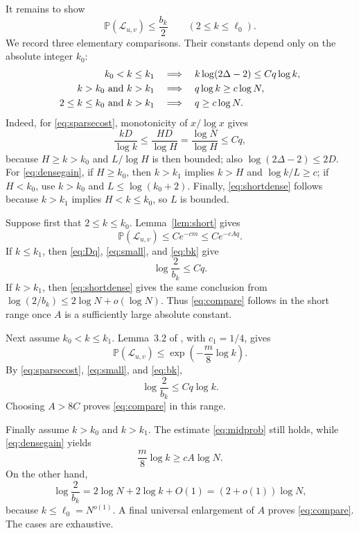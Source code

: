 \documentclass[11pt]{article}
\begin{document}
It remains to show
\begin{equation}\label{eq:compare}
 \mathbb P(\mathcal L_{u,v})\leq\frac{b_k}{2}
 \qquad (2\leq k\leq\ell_0).
\end{equation}
We record three elementary comparisons. Their constants depend only on the
absolute integer $k_0$:
\begin{align}
 k_0<k\leq k_1
 &\quad\Longrightarrow\quad
 k\log(2\Delta-2)\leq Cq\log k,
 \label{eq:sparsecost}\\
 k>k_0\ \hbox{and}\ k>k_1
 &\quad\Longrightarrow\quad
 q\log k\geq c\log N,
 \label{eq:densegain}\\
 2\leq k\leq k_0\ \hbox{and}\ k>k_1
 &\quad\Longrightarrow\quad
 q\geq c\log N.
 \label{eq:shortdense}
\end{align}
Indeed, for \eqref{eq:sparsecost}, monotonicity of $x/\log x$ gives
\[
 \frac{kD}{\log k}\leq\frac{HD}{\log H}
 =\frac{\log N}{\log H}\leq Cq,
\]
because $H\geq k>k_0$ and $L/\log H$ is then bounded; also
$\log(2\Delta-2)\leq2D$. For \eqref{eq:densegain}, if $H\geq k_0$, then
$k>k_1$ implies $k>H$ and $\log k/L\geq c$; if $H<k_0$, use
$k>k_0$ and $L\leq\log(k_0+2)$. Finally, \eqref{eq:shortdense} follows
because $k>k_1$ implies $H<k\leq k_0$, so $L$ is bounded.

Suppose first that $2\leq k\leq k_0$. Lemma~\ref{lem:short} gives
\begin{equation}\label{eq:shortprob}
 \mathbb P(\mathcal L_{u,v})\leq Ce^{-cm}\leq Ce^{-cAq}.
\end{equation}
If $k\leq k_1$, then \eqref{eq:Dq}, \eqref{eq:small}, and
\eqref{eq:bk} give
\[
 \log\frac2{b_k}\leq Cq.
\]
If $k>k_1$, then \eqref{eq:shortdense} gives the same conclusion from
$\log(2/b_k)\leq2\log N+o(\log N)$. Thus \eqref{eq:compare} follows in
the short range once $A$ is a sufficiently large absolute constant.

Next assume $k_0<k\leq k_1$. Lemma~3.2 of \cite{ADTT}, with $c_1=1/4$,
gives
\begin{equation}\label{eq:midprob}
 \mathbb P(\mathcal L_{u,v})
 \leq\exp\left(-\frac m8\log k\right).
\end{equation}
By \eqref{eq:sparsecost}, \eqref{eq:small}, and \eqref{eq:bk},
\[
 \log\frac2{b_k}\leq Cq\log k.
\]
Choosing $A>8C$ proves \eqref{eq:compare} in this range.

Finally assume $k>k_0$ and $k>k_1$. The estimate \eqref{eq:midprob} still
holds, while \eqref{eq:densegain} yields
\[
 \frac m8\log k\geq cA\log N.
\]
On the other hand,
\[
 \log\frac2{b_k}
 =2\log N+2\log k+O(1)
 =(2+o(1))\log N,
\]
because $k\leq\ell_0=N^{o(1)}$. A final universal enlargement of $A$
proves \eqref{eq:compare}. The cases are exhaustive.
\end{document}
